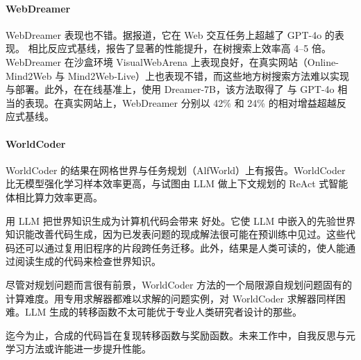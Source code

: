 \paragraph{WebDreamer} WebDreamer 表现也不错。据报道，它在 Web 交互任务上超越了 GPT-4o 的表现。
相比反应式基线，报告了显著的性能提升，在树搜索上效率高 4–5 倍。WebDreamer 在沙盒环境 VisualWebArena 上表现良好，在真实网站（Online-Mind2Web 与 Mind2Web-Live）上也表现不错，而这些地方树搜索方法难以实现与部署。此外，在在线基准上，使用 Dreamer-7B，该方法取得了
与 GPT-4o 相当的表现。在真实网站上，WebDreamer
分别以 42\% 和 24\% 的相对增益超越反应式基线。%

\paragraph{WorldCoder} 
WorldCoder 的结果在网格世界与任务规划（AlfWorld）上有报告。WorldCoder 比无模型强化学习样本效率更高，与试图由 LLM 做上下文规划的 ReAct 式智能体相比算力效率更高。%


用 LLM 把世界知识生成为计算机代码会带来
好处。它使 LLM 中嵌入的先验世界知识能改善代码生成，因为已发表问题的现成解法很可能在预训练中见过。这些代码还可以通过复用旧程序的片段跨任务迁移。此外，结果是人类可读的，使人能通过阅读生成的代码来检查世界知识。

尽管对规划问题而言很有前景，WorldCoder 方法的一个局限源自规划问题固有的计算难度。用专用求解器都难以求解的问题实例，对 WorldCoder 求解器同样困难。LLM 生成的转移函数不太可能优于专业人类研究者设计的那些。%

迄今为止，合成的代码旨在复现转移函数与奖励函数。未来工作中，自我反思与元学习方法或许能进一步提升性能。



